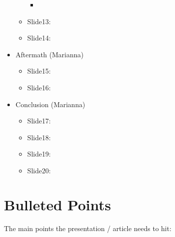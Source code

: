 \documentclass{scrartcl}
\begin{document}
\begin{itemize}
\begin{itemize}
\begin{itemize}
            \item 
        \end{itemize}
    \end{itemize}
    \begin{itemize}
        \item Slide13:
    \end{itemize}
    \begin{itemize}
        \item Slide14:
    \end{itemize}
    \item Aftermath (Marianna)
    \begin{itemize}
        \item Slide15:
    \end{itemize}
    \begin{itemize}
        \item Slide16:
\end{itemize}
\item Conclusion (Marianna)
    \begin{itemize}
        \item Slide17:
    \end{itemize}
    \begin{itemize}
        \item Slide18:
    \end{itemize}
    \begin{itemize}
        \item Slide19:
    \end{itemize}
    \begin{itemize}
        \item Slide20:
    \end{itemize}
\end{itemize}

\section{Bulleted Points}

The main points the presentation / article needs to hit:
\end{document}
